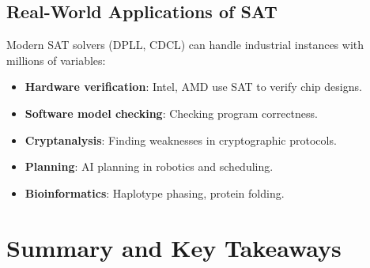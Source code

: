 \documentclass[12pt,a4paper]{article}
\begin{document}
\subsection{Real-World Applications of SAT}

Modern SAT solvers (DPLL, CDCL) can handle industrial instances with millions of variables:

\begin{itemize}[leftmargin=2em]
  \item \textbf{Hardware verification}: Intel, AMD use SAT to verify chip designs.
  \item \textbf{Software model checking}: Checking program correctness.
  \item \textbf{Cryptanalysis}: Finding weaknesses in cryptographic protocols.
  \item \textbf{Planning}: AI planning in robotics and scheduling.
  \item \textbf{Bioinformatics}: Haplotype phasing, protein folding.
\end{itemize}

\newpage

\section{Summary and Key Takeaways}
\end{document}
